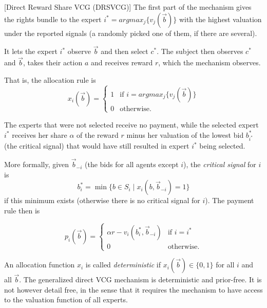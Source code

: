 \begin{mech}\label{mech:shareVCG}[Direct Reward Share VCG (DRSVCG)]
   The first part of the mechanism gives the rights bundle to the expert $i^*=argmax_j \{v_j(\vec b)\} $ with the highest valuation under the reported signals (a randomly picked one of them, if there are several).

It lets the expert $i^*$ observe  $\vec{b}$ and then select $c^*$.
The subject then observes $c^*$ and $\vec{b}$, takes their action $a$ and receives reward $r$, which the mechanism observes. 


   That is, the allocation rule is
   $$x_i(\vec{b}) = \begin{cases} 1 & \text{if } i = argmax_j \{v_j(\vec b)\}  \\ 0 & \text{otherwise.} \end{cases}$$


The experts that were not selected receive no payment, while the selected expert $i^*$ receives her share $\alpha$ of the reward $r$ minus her valuation of the lowest bid $b_{i^*}^*$ (the critical signal) that would have still resulted in expert $i^*$ being selected.

More formally, given $\vec{b}_{-i}$ (the bids for all agents except $i$), the {\sl critical signal} for $i$ is
$$b_i^* = \min\{b\in S_i\mid x_i(b,\vec b_{-i})=1\}$$
if this minimum exists (otherwise there is no critical signal for $i$).
The payment rule then is

   $$p_i(\vec b)= \begin{cases}  \alpha r - v_i(b_i^*,\vec{b}_{-i})& \text{if }i = i^* \\ 0 & \text{otherwise.} \end{cases}$$

\end{mech}

An allocation function $x_i$ is called {\sl deterministic} if $x_i(\vec{b})\in \{0,1\}$ for all $i$ and all $\vec{b}$.
The generalized direct VCG mechanism is deterministic and prior-free. It is not however detail free, in the sense that it requires the mechanism to have access to the valuation function of all experts. 

